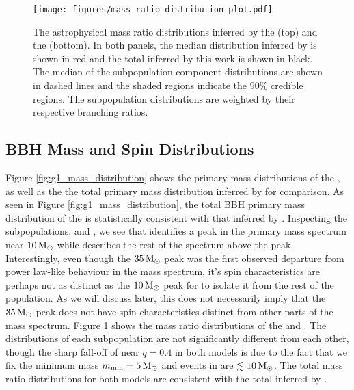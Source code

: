 \begin{figure}[ht!]
    \begin{centering}
        \texttt{[image: figures/mass\_ratio\_distribution\_plot.pdf]}
        \caption{The astrophysical mass ratio distributions inferred by the \base{} (top) and the \comp{} (bottom). In both panels, the median distribution inferred by \brucepaper is shown in red and the total inferred by this work is shown in black. The median of the subpopulation component distributions are shown in dashed lines and the shaded regions indicate the $90\%$ credible regions. The subpopulation distributions are weighted by their respective branching ratios.}
        \label{fig:mass_ratio_distribution}
    \end{centering}
\end{figure}

\subsection{BBH Mass and Spin Distributions}

Figure \ref{fig:g1_mass_distribution} shows the primary mass distributions of the \base{}, as well as the the total primary mass distribution inferred by \brucepaper{} for comparison. As seen in Figure \ref{fig:g1_mass_distribution}, the total BBH primary mass distribution of the \base{} is statistically consistent with that inferred by \brucepaper{}. Inspecting the subpopulations, \first{} and \contB{}, we see that \first{} identifies a peak in the primary mass spectrum near $10{\,\rm M}_\odot$ while \contB{} describes the rest of the spectrum above the peak. Interestingly, even though the $35{\,\rm M}_\odot$ peak was the first observed departure from power law-like behaviour in the mass spectrum, it's spin characteristics are perhaps not as distinct as the $10{\,\rm M}_\odot$ peak for \first{} to isolate it from the rest of the population. As we will discuss later, this does not necessarily imply that the $35{\,\rm M}_\odot$ peak does not have spin characteristics distinct from other parts of the mass spectrum. Figure \ref{fig:mass_ratio_distribution} shows the mass ratio distributions of the \base{} and \comp{}. The distributions of each subpopulation are not significantly different from each other, though the sharp fall-off of \first{} near $q=0.4$ in both models is due to the fact that we fix the minimum mass $m_\text{min}=5{\,\rm M}_\odot$ and events in \first{} are $\lesssim10{\,\rm M}_\odot$. The total mass ratio distributions for both models are consistent with the total inferred by \brucepaper.  


